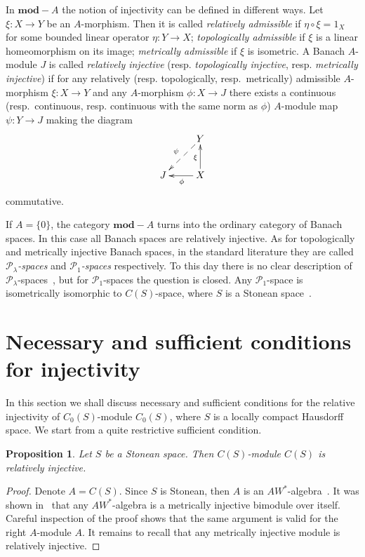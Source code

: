 \documentclass[12pt]{article}
\newtheorem{proposition}[theorem]{Proposition}
\begin{document}
In $\mathbf{mod}-A$ the notion of injectivity can be defined in different ways.
Let $\xi:X\to Y$ be an $A$-morphism. Then it is called \textit{relatively
    admissible} if $\eta\circ \xi=1_X$ for some bounded linear operator $\eta:Y\to
    X$; \textit{topologically admissible} if $\xi$ is a linear homeomorphism on its
image; \textit{metrically admissible} if $\xi$ is isometric. A Banach $A$-module
$J$ is called \textit{relatively injective} (resp. \textit{topologically
    injective}, resp. \textit{metrically injective}) if for any relatively (resp.
topologically, resp.\ metrically) admissible $A$-morphism $\xi:X\to Y$ and any
$A$-morphism $\phi:X\to J$ there exists a continuous (resp.\ continuous, resp.
continuous with the same norm as $\phi$) $A$-module map $\psi:Y\to J$ making the
diagram
$$
    \xymatrix{
    & {Y} \\
    {J} \ar@{<--}[ur]^{\psi} &{X} \ar[u]^{\xi} \ar[l]^{\phi}}  %
$$
commutative.

If $A=\{0\}$, the category $\mathbf{mod}-A$ turns into the ordinary category of
Banach spaces. In this case all Banach spaces are relatively injective. As for
topologically and metrically injective Banach spaces, in the standard literature
they are called \textit{$\mathcal{P}_\lambda$-spaces} and
\textit{$\mathcal{P}_1$-spaces} respectively. To this day there is no clear
description of $\mathcal{P}_\lambda$-spaces~\cite[page vi]{AvilSepInjBanSp}, but
for $\mathcal{P}_1$-spaces the question is closed. Any $\mathcal{P}_1$-space is
isometrically isomorphic to $C(S)$-space, where $S$ is a Stonean
space~\cite{HasumExtPropCompBanSp}.


\section{Necessary and sufficient conditions for
  injectivity}\label{SecionNecessaryAndSufficientConditionsForInjectivity}

In this section we shall discuss necessary and sufficient conditions for the
relative injectivity of $C_0(S)$-module $C_0(S)$, where $S$ is a locally compact
Hausdorff space. We start from a quite restrictive sufficient condition.

\begin{proposition}\label{SStonImplRelInjCSModCS} Let $S$ be a Stonean space.
    Then $C(S)$-module $C(S)$ is relatively injective.
\end{proposition}
\begin{proof} Denote $A=C(S)$. Since $S$ is Stonean, then $A$ is an
    $AW^*$-algebra~\cite[section 1, paragraph 7]{BerbBaerStRng}. It was shown
    in~\cite[theorem 2]{TakHanBanThAndJordDecomOfModMap} that any $AW^*$-algebra
    is a metrically injective bimodule over itself. Careful inspection of the
    proof shows that the same argument is valid for the right $A$-module $A$. It
    remains to recall that any metrically injective module is relatively
    injective.
\end{proof}
\end{document}
